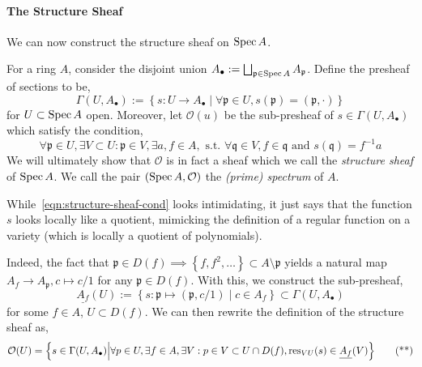 \documentclass[000-main.tex]{subfiles}
\begin{document}
\paragraph{The Structure Sheaf}

We can now construct the structure sheaf on $\operatorname{Spec} A$.
\begin{definition}
  For a ring $A$, consider the disjoint union $A_{\bullet} := \bigsqcup_{\mathfrak{p}\in\operatorname{Spec} A}A_\mathfrak{p}$.
  Define the presheaf of sections to be,
  \begin{displaymath}
    \Gamma(U, A_\bullet) := \left\{ s: U \to A_{\bullet} \mid \forall\mathfrak{p}\in U, s(\mathfrak{p}) = (\mathfrak{p}, \cdot) \right\}
  \end{displaymath}
  for $U\subset\operatorname{Spec} A$ open.
  Moreover, let $\mathcal{O}(u)$ be the sub-presheaf of $s\in \Gamma(U, A_\bullet)$ which satisfy the condition,
  \begin{equation}\label{eqn:structure-sheaf-cond}
      \forall \mathfrak{p}\in U,
      \exists V\subset U : \mathfrak{p}\in V,
      \exists a, f\in A, \text{ s.t.\ }
      \forall \mathfrak{q}\in V,
      f\in \mathfrak{q} \text{ and }
      s(\mathfrak{q}) = f^{-1}a
      \tag{$*$}
  \end{equation}
  We will ultimately show that $\mathcal{O}$ is in fact a sheaf which we call the \emph{structure sheaf} of $\operatorname{Spec} A$.
  We call the pair $(\operatorname{Spec} A, \mathcal{O})$ the \emph{(prime) spectrum} of $A$.
\end{definition}

\begin{remark}
  While~\eqref{eqn:structure-sheaf-cond} looks intimidating, it just says that the function $s$ looks locally like a quotient, mimicking the definition of a regular function on a variety (which is locally a quotient of polynomials).

  Indeed, the fact that $\mathfrak{p}\in D(f) \implies \left\{ f, f^2, \ldots \right\}\subset A\setminus\mathfrak{p}$ yields a natural map $A_f \to A_\mathfrak{p}, c\mapsto c/1$ for any $\mathfrak{p}\in D(f)$.
  With this, we construct the sub-presheaf,
  \begin{displaymath}
    \underline{A_f}(U) := \left\{
      s: \mathfrak{p}\mapsto (\mathfrak{p}, c/1) \mid
      c \in A_f
    \right\} \subset \Gamma(U, A_{\bullet})
  \end{displaymath}
  for some $f\in A$, $U\subset D(f)$.
  We can then rewrite the definition of the structure sheaf as,
  \begin{equation}\label{eq:structure-sheaf-cond-alt}
    \mathcal{O}(U) = \qty{
      s\in\Gamma(U, A_{\bullet}) \middle\vert
      \forall p\in U,
      \exists f\in A,
      \exists V : p\in V\subset U\cap D(f),
      \operatorname{res}_{VU}(s) \in \underline{A_f}(V)
    }\tag{**}
  \end{equation}
\end{remark}
\end{document}
